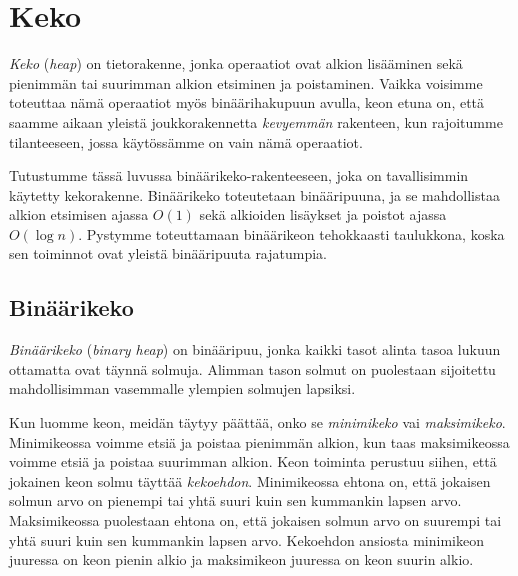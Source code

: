 \chapter{Keko}


\emph{Keko} (\emph{heap}) on tietorakenne, jonka operaatiot ovat
alkion lisääminen sekä
pienimmän tai suurimman alkion etsiminen ja poistaminen.
Vaikka voisimme toteuttaa nämä operaatiot myös
binäärihakupuun avulla, keon etuna on, että saamme aikaan
yleistä joukkorakennetta \emph{kevyemmän} rakenteen, kun
rajoitumme tilanteeseen, jossa käytössämme on vain nämä operaatiot.

Tutustumme tässä luvussa binäärikeko-rakenteeseen,
joka on tavallisimmin käytetty kekorakenne.
Binäärikeko toteutetaan binääripuuna,
ja se mahdollistaa alkion etsimisen ajassa $O(1)$ sekä
alkioiden lisäykset ja poistot ajassa $O(\log n)$.
Pystymme toteuttamaan binäärikeon tehokkaasti taulukkona,
koska sen toiminnot ovat yleistä binääripuuta rajatumpia.

\section{Binäärikeko}


\emph{Binäärikeko} (\emph{binary heap}) on binääripuu, jonka kaikki tasot
alinta tasoa lukuun ottamatta ovat täynnä solmuja.
Alimman tason solmut on puolestaan sijoitettu
mahdollisimman vasemmalle ylempien solmujen lapsiksi.


Kun luomme keon, meidän täytyy päättää,
onko se \emph{minimikeko} vai \emph{maksimikeko}.
Minimikeossa voimme etsiä ja poistaa pienimmän alkion,
kun taas maksimikeossa voimme etsiä ja poistaa suurimman alkion.
Keon toiminta perustuu siihen, että jokainen
keon solmu täyttää \emph{kekoehdon}.
Minimikeossa ehtona on, että jokaisen solmun arvo on
pienempi tai yhtä suuri kuin sen kummankin lapsen arvo.
Maksimikeossa puolestaan ehtona on, että jokaisen solmun arvo
on suurempi tai yhtä suuri kuin sen kummankin lapsen arvo.
Kekoehdon ansiosta minimikeon juuressa on keon
pienin alkio ja maksimikeon juuressa on keon suurin alkio.

